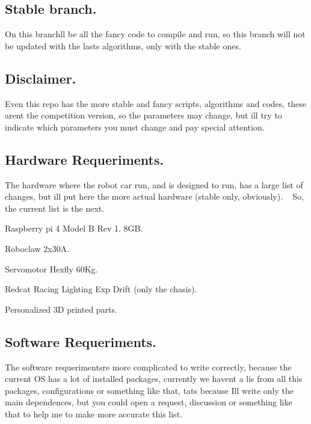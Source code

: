 \subsection*{Stable branch.}

On this branch\textquotesingle{}ll be all the fancy code to compile and run, so this branch will not be updated with the lasts algorithms, only with the stable ones.

\subsection*{Disclaimer.}

Even this repo has the more stable and fancy scripts, algorithms and codes, these aren\textquotesingle{}t the competition version, so the parameters may change, but i\textquotesingle{}ll try to indicate which parameters you must change and pay special attention.

\subsection*{Hardware Requeriments.}

The hardware where the robot car run, and is designed to run, has a large list of changes, but i\textquotesingle{}ll put here the more actual hardware (stable only, obviously). ~\newline
So, the current list is the next. ~\newline

\begin{DoxyItemize}
\item Raspberry pi 4 Model B Rev 1. 8\+GB.
\item Roboclaw 2x30A.
\item Servomotor Hexfly 60\+Kg.
\item Redcat Racing Lighting Exp Drift (only the chasis).
\item Personalized 3D printed parts.
\end{DoxyItemize}

\subsection*{Software Requeriments.}

The software requeriments\textquotesingle{}re more complicated to write correctly, because the current OS has a lot of installed packages, currently we haven\textquotesingle{}t a lis from all this packages, configurations or something like that, tat\textquotesingle{}s because I\textquotesingle{}ll write only the main dependences, but you could open a request, discussion or something like that to help me to make more accurate this list. ~\newline

